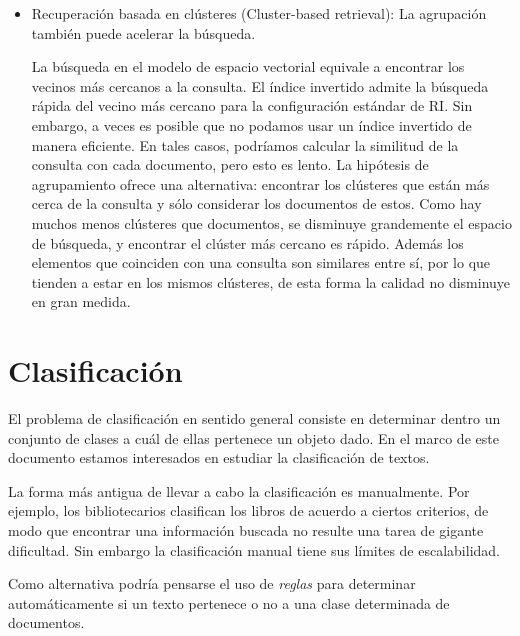 \documentclass{llncs}
\begin{document}
\begin{itemize}
	\item Recuperaci\'on basada en cl\'usteres (Cluster-based retrieval): La agrupación también puede acelerar la búsqueda. 
	
	La búsqueda en el modelo de espacio vectorial equivale a encontrar los vecinos más cercanos a la consulta. El índice invertido admite la búsqueda rápida del vecino más cercano para la configuración estándar de RI. Sin embargo, a veces es posible que no podamos usar un índice invertido de manera eficiente. En tales casos, podríamos calcular la similitud de la consulta con cada documento, pero esto es lento. La hipótesis de agrupamiento ofrece una alternativa: encontrar los cl\'usteres que están más cerca de la consulta y sólo considerar los documentos de estos. Como hay muchos menos clústeres que documentos, se disminuye grandemente el espacio de b\'usqueda, y encontrar el clúster más cercano es rápido. Adem\'as los elementos que coinciden con una consulta son similares entre sí, por lo que tienden a estar en los mismos cl\'usteres, de esta forma la calidad no disminuye en gran medida.
\end{itemize}

\section{Clasificaci\'on}

	El problema de clasificaci\'on en sentido general consiste en determinar dentro un conjunto de clases a cu\'al de ellas pertenece un objeto dado. En el marco de este documento estamos interesados en estudiar la clasificaci\'on de textos. 
	
%	
	La forma m\'as antigua de llevar a cabo la clasificaci\'on es manualmente. Por ejemplo, los bibliotecarios clasifican los libros de acuerdo a ciertos criterios, de modo que encontrar una informaci\'on buscada no resulte una tarea de gigante dificultad. Sin embargo la clasificaci\'on manual tiene sus l\'imites de escalabilidad. 
	
	Como alternativa podr\'ia pensarse el uso de \emph{reglas} para determinar autom\'aticamente si un texto pertenece o no a una clase determinada de documentos.
	
\end{document}
